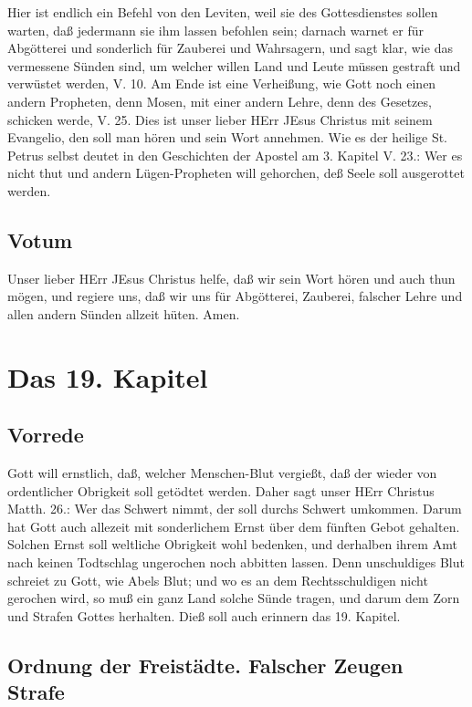 Hier ist endlich ein Befehl von den Leviten, weil sie des Gottesdienstes sollen warten, daß jedermann sie ihm lassen befohlen sein; darnach warnet er für Abgötterei und sonderlich für Zauberei und Wahrsagern, und sagt klar, wie das vermessene Sünden sind, um welcher willen Land und Leute müssen gestraft und verwüstet werden, V. 10. Am Ende ist eine Verheißung, wie Gott noch einen andern Propheten, denn Mosen, mit einer andern Lehre, denn des Gesetzes, schicken werde, V. 25. Dies ist unser lieber HErr JEsus Christus mit seinem Evangelio, den soll man hören und sein Wort annehmen. Wie es der heilige St. Petrus selbst deutet in den Geschichten der Apostel am 3. Kapitel V. 23.: Wer es nicht thut und andern Lügen-Propheten will gehorchen, deß Seele soll ausgerottet werden.

\section{Votum}

Unser lieber HErr JEsus Christus helfe, daß wir sein Wort hören und auch thun mögen, und regiere uns, daß wir uns für Abgötterei, Zauberei, falscher Lehre und allen andern Sünden allzeit hüten. Amen.

\chapter{Das 19. Kapitel}

\section{Vorrede}

Gott will ernstlich, daß, welcher Menschen-Blut vergießt, daß der wieder von ordentlicher Obrigkeit soll getödtet werden. Daher sagt unser HErr Christus Matth. 26.: Wer das Schwert nimmt, der soll durchs Schwert umkommen. Darum hat Gott auch allezeit mit sonderlichem Ernst über dem fünften Gebot gehalten. Solchen Ernst soll weltliche Obrigkeit wohl bedenken, und derhalben ihrem Amt nach keinen Todtschlag ungerochen noch abbitten lassen. Denn unschuldiges Blut schreiet zu Gott, wie Abels Blut; und wo es an dem Rechtsschuldigen nicht gerochen wird, so muß ein ganz Land solche Sünde tragen, und darum dem Zorn und Strafen Gottes herhalten. Dieß soll auch erinnern das 19. Kapitel.

\section{Ordnung der Freistädte. Falscher Zeugen Strafe}


